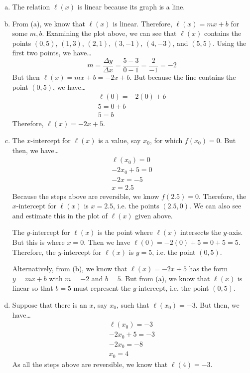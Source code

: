 \documentclass[11pt,letterpaper]{article}
\begin{document}
\sol 
\begin{enumerate}[(a)]
\item The relation $\ell(x)$ is linear because its graph is a line. \pspace

\item From (a), we know that $\ell(x)$ is linear. Therefore, $\ell(x)= mx + b$ for some $m, b$. Examining the plot above, we can see that $\ell(x)$ contains the points $(0, 5)$, $(1, 3)$, $(2, 1)$, $(3, -1)$, $(4, -3)$, and $(5, 5)$. Using the first two points, we have\dots
	\[
	m= \dfrac{\Delta y}{\Delta x}= \dfrac{5 - 3}{0 - 1}= \dfrac{2}{-1}= -2 
	\]
But then $\ell(x)= mx + b= -2x + b$. But because the line contains the point $(0, 5)$, we have\dots
	\[
	\begin{gathered}
	\ell(0)= -2(0) + b \\
	5= 0 + b \\
	5= b
	\end{gathered}
	\]
Therefore, $\ell(x)= -2x + 5$. 

\item The $x$-intercept for $\ell(x)$ is a value, say $x_0$, for which $f(x_0)= 0$. But then, we have\dots
	\[
	\begin{gathered}
	\ell(x_0)= 0 \\
	-2x_0 + 5= 0 \\
	-2x= -5 \\
	x= 2.5
	\end{gathered}
	\]
Because the steps above are reversible, we know $f(2.5)= 0$. Therefore, the $x$-intercept for $\ell(x)$ is $x= 2.5$, i.e. the points $(2.5, 0)$. We can also see and estimate this in the plot of $\ell(x)$ given above. \pspace

The $y$-intercept for $\ell(x)$ is the point where $\ell(x)$ intersects the $y$-axis. But this is where $x=0$. Then we have $\ell(0)= -2(0) + 5= 0 + 5= 5$. Therefore, the $y$-intercept for $\ell(x)$ is $y= 5$, i.e. the point $(0, 5)$. \pspace

Alternatively, from (b), we know that $\ell(x)= -2x + 5$ has the form $y= mx + b$ with $m= -2$ and $b= 5$. But from (a), we know that $\ell(x)$ is linear so that $b= 5$ must represent the $y$-intercept, i.e. the point $(0, 5)$. \pspace

\item Suppose that there is an $x$, say $x_0$, such that $\ell(x_0)= -3$. But then, we have\dots
	\[
	\begin{gathered}
	\ell(x_0)= -3 \\
	-2x_0 + 5= -3 \\
	-2x_0= -8 \\
	x_0= 4
	\end{gathered}
	\]
As all the steps above are reversible, we know that $\ell(4)= -3$. 
\end{enumerate}
\end{document}
